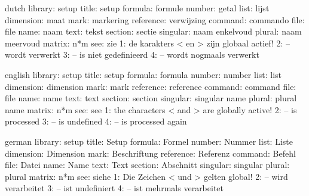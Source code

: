 \startmessages  dutch  library: setup  
        title:  setup
      formula:  formule
       number:  getal
         list:  lijst
    dimension:  maat 
         mark:  markering
    reference:  verwijzing
      command:  commando
         file:  file
         name:  naam
         text:  tekst
      section:  sectie
     singular:  naam enkelvoud
       plural:  naam meervoud
       matrix:  n*m
          see:  zie
            1:  de karakters < en > zijn globaal actief!
            2:  -- wordt verwerkt
            3:  -- is niet gedefinieerd
            4:  -- wordt nogmaals verwerkt
\stopmessages

\startmessages  english  library: setup  
        title:  setup
      formula:  formula
       number:  number
         list:  list
    dimension:  dimension 
         mark:  mark
    reference:  reference
      command:  command
         file:  file
         name:  name
         text:  text
      section:  section
     singular:  singular name 
       plural:  plural name 
       matrix:  n*m
          see:  see 
            1:  the characters < and > are globally active!
            2:  -- is processed
            3:  -- is undefined
            4:  -- is processed again
\stopmessages

\startmessages  german library: setup
        title:  Setup
      formula:  Formel
       number:  Nummer
         list:  Liste
    dimension:  Dimension
         mark:  Beschriftung
    reference:  Referenz
      command:  Befehl
         file:  Datei
         name:  Name
         text:  Text
      section:  Abschnitt
     singular:  singular
       plural:  plural
       matrix:  n*m
          see:  siehe
            1:  Die Zeichen < und > gelten global!
            2:  -- wird verarbeitet
            3:  -- ist undefiniert
            4:  -- ist mehrmals verarbeitet
\stopmessages


\interfacetranslationtrue  






\def\setupnumfont  {}
\def\setuptxtfont  {\tttf}
\def\setupvarfont  {\ttsl}
\def\setupoptfont  {\ttsl}
\def\setupalwcolor {}
\def\setupoptcolor {darkgray}



